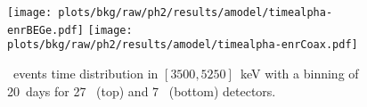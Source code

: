 \begin{figure}
  \centering
  \texttt{[image: plots/bkg/raw/ph2/results/amodel/timealpha-enrBEGe.pdf]}
  \texttt{[image: plots/bkg/raw/ph2/results/amodel/timealpha-enrCoax.pdf]}
  \caption{%
    \a\ events time distribution in $[3500,5250]$~keV with a binning of 20~days for 27
    \bege\ (top) and 7 \scoax\ (bottom) detectors.
  }\label{fig:apdx:timealpha:plotresults}
\end{figure}

\begin{table}
  \centering
  \caption{%
    Results of the \a\ events time distribution analysis in $[3500,5250]$~keV with a
    binning of 20~days for 27 \bege\ and 7 \scoax\ detectors.
  }\label{tab:apdx:timealpha:results}
  
\end{table}

